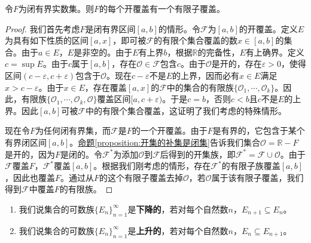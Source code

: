 \documentclass[lang=cn,newtx,10pt,scheme=chinese]{../Template/elegantbook}
\begin{document}
\begin{theorem}\label{theorem:Heine - Borel定理}
  令\(F\)为闭有界实数集。则\(F\)的每个开覆盖有一个有限子覆盖。
\end{theorem}
\begin{proof}
  我们首先考虑\(F\)是闭有界区间\([a, b]\)的情形。令\(\mathcal{F}\)为\([a, b]\)的开覆盖。定义\(E\)为具有如下性质的区间\([a, x]\)，即可被\(\mathcal{F}\)的有限个集合覆盖的数\(x\in[a, b]\)的集合。由于\(a\in E\)，\(E\)是非空的。由于\(E\)有上界\(b\)，根据\(\mathbb{R}\)的完备性，\(E\)有上确界。定义\(c = \sup E\)。由于\(c\)属于\([a, b]\)，存在\(\mathcal{O}\in\mathcal{F}\)包含\(c\)。由于\(\mathcal{O}\)是开的，存在\(\varepsilon>0\)，使得区间\((c - \varepsilon, c+\varepsilon)\)包含于\(\mathcal{O}\)。现在\(c - \varepsilon\)不是\(E\)的上界，因而必有\(x\in E\)满足\(x>c - \varepsilon\)。由于\(x\in E\)，存在覆盖\([a, x]\)的\(\mathcal{F}\)中的集合的有限族\(\{\mathcal{O}_1, \cdots, \mathcal{O}_k\}\)。因此，有限族\(\{\mathcal{O}_1, \cdots, \mathcal{O}_k, \mathcal{O}\}\)覆盖区间\([a, c+\varepsilon)\)。于是\(c = b\)，否则\(c < b\)且\(c\)不是\(E\)的上界。因此\([a, b]\)可被\(\mathcal{F}\)中的有限个集合覆盖，这证明了我们考虑的特殊情形。

现在令\(F\)为任何闭有界集，而\(\mathcal{F}\)是\(F\)的一个开覆盖。由于\(F\)是有界的，它包含于某个有界闭区间\([a, b]\)。\hyperref[proposition:开集的补集是闭集]{命题\ref{proposition:开集的补集是闭集}}告诉我们集合\(\mathcal{O}=\mathbb{R}- F\)是开的，因为\(F\)是闭的。令\(\mathcal{F}^*\)为添加\(\mathcal{O}\)到\(\mathcal{F}\)后得到的开集族，即\(\mathcal{F}^*=\mathcal{F}\cup\mathcal{O}\)。由于\(\mathcal{F}\)覆盖\(F\)，\(\mathcal{F}^*\)覆盖\([a, b]\)。根据我们刚考虑的情形，存在\(\mathcal{F}^*\)的有限子族覆盖\([a, b]\)，因此也覆盖\(F\)。通过从\(F\)的这个有限子覆盖去掉\(\mathcal{O}\)，若\(\mathcal{O}\)属于该有限子覆盖，我们得到\(\mathcal{F}\)中覆盖\(F\)的有限族。

\end{proof}

\begin{definition}[集族的下降与上升]\label{definition:集族的下降与上升}
\begin{enumerate}
  \item 我们说集合的可数族\(\{E_n\}_{n = 1}^{\infty}\)是\textbf{下降的}，若对每个自然数\(n\)，\(E_{n + 1}\subseteq E_n\)。

  \item 我们说集合的可数族\(\{E_n\}_{n = 1}^{\infty}\)是\textbf{上升的}，若对每个自然数\(n\)，\(E_n\subseteq E_{n + 1}\)。
\end{enumerate}
\end{definition}
\end{document}
